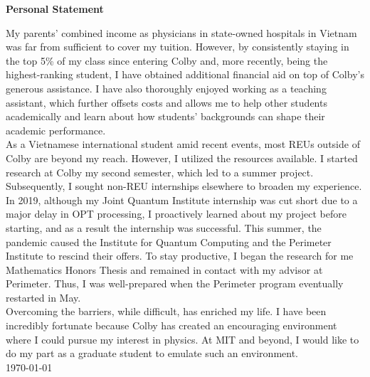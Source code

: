 \documentclass[12pt]{article}
\begin{document}
\begin{center}
	\textbf{Personal Statement}
\end{center}
My parents' combined income as physicians in state-owned hospitals in Vietnam was far from sufficient to cover my tuition. However, by consistently staying in the top 5\% of my class since entering Colby and, more recently, being the highest-ranking student, I have obtained additional financial aid on top of Colby's generous assistance. I have also thoroughly enjoyed working as a teaching assistant, which further offsets costs and allows me to help other students academically and learn about how students' backgrounds can shape their academic performance. \\

As a Vietnamese international student amid recent events, most REUs outside of Colby are beyond my reach. However, I utilized the resources available. I started research at Colby my second semester, which led to a summer project. Subsequently, I sought non-REU internships elsewhere to broaden my experience. In 2019, although my Joint Quantum Institute internship was cut short due to a major delay in OPT processing, I proactively learned about my project before starting, and as a result the internship was successful. This summer, the pandemic caused the Institute for Quantum Computing and the Perimeter Institute to rescind their offers. To stay productive, I began the research for me Mathematics Honors Thesis and remained in contact with my advisor at Perimeter. Thus, I was well-prepared when the Perimeter program eventually restarted in May.\\

Overcoming the barriers, while difficult, has enriched my life. I have been incredibly fortunate because Colby has created an encouraging environment where I could pursue my interest in physics. At MIT and beyond, I would like to do my part as a graduate student to emulate such an environment.\\

\noindent \today
\end{document}

